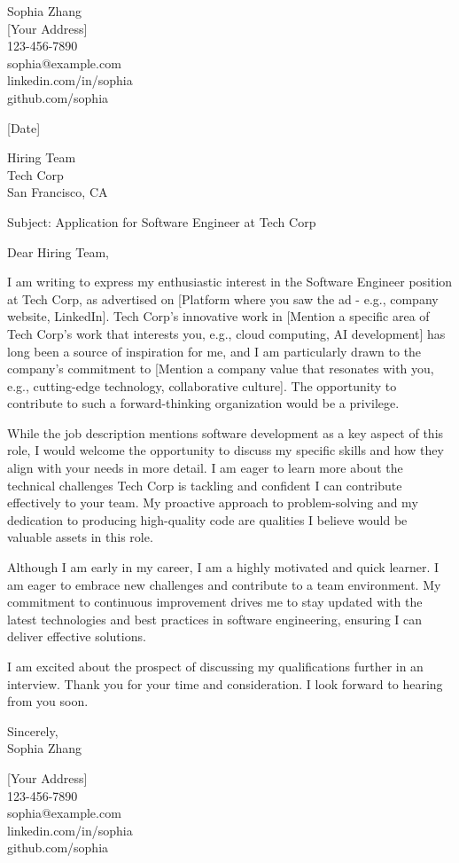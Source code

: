 \documentclass[
]{article}
\author{}
\date{}
\begin{document}
Sophia Zhang\\
{[}Your Address{]}\\
123-456-7890\\
sophia@example.com\\
linkedin.com/in/sophia\\
github.com/sophia

{[}Date{]}

Hiring Team\\
Tech Corp\\
San Francisco, CA

Subject: Application for Software Engineer at Tech Corp

Dear Hiring Team,

I am writing to express my enthusiastic interest in the Software
Engineer position at Tech Corp, as advertised on {[}Platform where you
saw the ad - e.g., company website, LinkedIn{]}. Tech Corp's innovative
work in {[}Mention a specific area of Tech Corp's work that interests
you, e.g., cloud computing, AI development{]} has long been a source of
inspiration for me, and I am particularly drawn to the company's
commitment to {[}Mention a company value that resonates with you, e.g.,
cutting-edge technology, collaborative culture{]}. The opportunity to
contribute to such a forward-thinking organization would be a privilege.

While the job description mentions software development as a key aspect
of this role, I would welcome the opportunity to discuss my specific
skills and how they align with your needs in more detail. I am eager to
learn more about the technical challenges Tech Corp is tackling and
confident I can contribute effectively to your team. My proactive
approach to problem-solving and my dedication to producing high-quality
code are qualities I believe would be valuable assets in this role.

Although I am early in my career, I am a highly motivated and quick
learner. I am eager to embrace new challenges and contribute to a team
environment. My commitment to continuous improvement drives me to stay
updated with the latest technologies and best practices in software
engineering, ensuring I can deliver effective solutions.

I am excited about the prospect of discussing my qualifications further
in an interview. Thank you for your time and consideration. I look
forward to hearing from you soon.

Sincerely,\\
Sophia Zhang

{[}Your Address{]}\\
123-456-7890\\
sophia@example.com\\
linkedin.com/in/sophia\\
github.com/sophia
\end{document}
